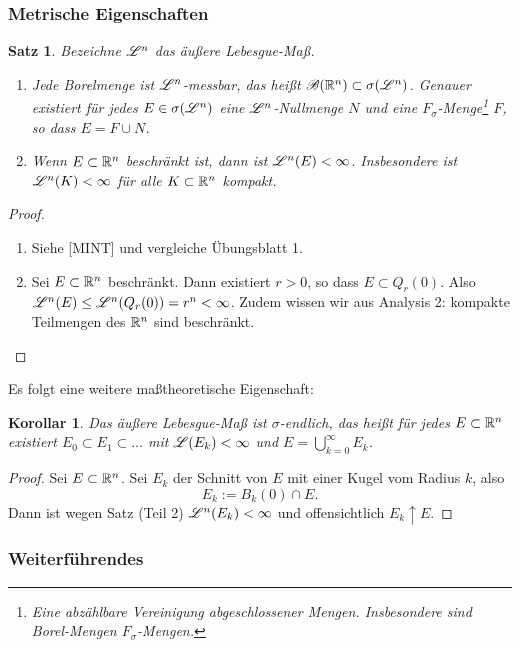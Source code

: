 \documentclass[
 a4paper,
 12pt,
 parskip=half
 ]{scrartcl}
\theoremstyle{plain}
\newtheorem*{thm*}{Satz}
\newtheorem*{kor}{Korollar}
\theoremstyle{definition}
\numberwithin{equation}{section}
\begin{document}
\subsubsection{Metrische Eigenschaften}
\begin{thm*}
 Bezeichne $\mathscr{L}^n$ das äußere Lebesgue-Maß.
 \begin{enumerate}
  \item Jede Borelmenge ist $\mathscr{L}^n$-messbar, das heißt $\mathscr{B}( \mathbb{R}^n ) \subset \sigma(\mathscr{L}^n)$. Genauer existiert für jedes $E \in \sigma(\mathscr{L}^n)$ eine $\mathscr{L}^n$-Nullmenge $N$ und eine $F_\sigma$-Menge\footnote{Eine abzählbare Vereinigung abgeschlossener Mengen. Insbesondere sind Borel-Mengen $F_\sigma$-Mengen.} $F$, so dass $E = F \cup N$.
  \item Wenn $E \subset \mathbb{R}^n$ beschränkt ist, dann ist $\mathscr{L}^n(E) < \infty$. Insbesondere ist $\mathscr{L}^n (K) < \infty$ für alle $K \subset \mathbb{R}^n$ kompakt.
 \end{enumerate}
\end{thm*}

\begin{proof}
 \begin{enumerate}
  \item Siehe [MINT] und vergleiche Übungsblatt 1.
  \item Sei $E \subset \mathbb{R}^n$ beschränkt. Dann existiert $r > 0$, so dass $E \subset Q_r(0)$. Also $\mathscr{L}^n(E) \le \mathscr{L}^n( Q_r(0) ) = r^n < \infty$. Zudem wissen wir aus Analysis 2: kompakte Teilmengen des $\mathbb{R}^n$ sind beschränkt. \qedhere
 \end{enumerate}
\end{proof}

Es folgt eine weitere maßtheoretische Eigenschaft:

\begin{kor}
 Das äußere Lebesgue-Maß ist $\sigma$-endlich, das heißt für jedes $E \subset \mathbb{R}^n$ existiert $E_0 \subset E_1 \subset \ldots$ mit $\mathscr{L}(E_k) < \infty$ und $E = \bigcup_{k=0}^\infty E_k$.
\end{kor}

\begin{proof}
 Sei $E \subset \mathbb{R}^n$. Sei $E_k$ der Schnitt von $E$ mit einer Kugel vom Radius $k$, also
 \[ E_k := B_k(0) \cap E. \]
 Dann ist wegen Satz (Teil 2) $\mathscr{L}^n(E_k) < \infty$ und offensichtlich $E_k \uparrow E$.
\end{proof}

\subsubsection*{Weiterführendes}
\end{document}
